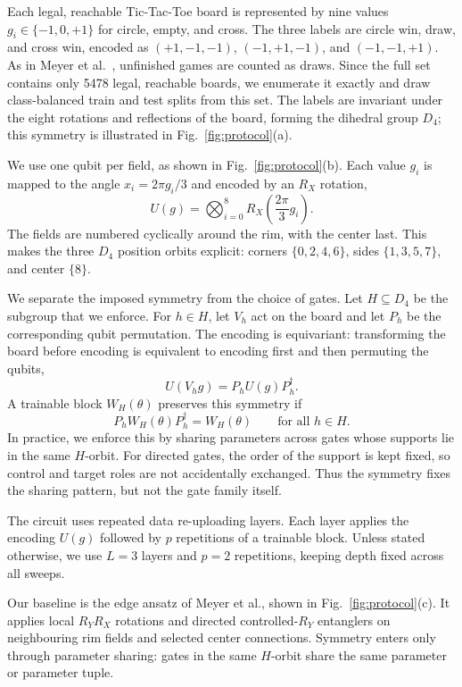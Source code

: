 Each legal, reachable Tic-Tac-Toe board is represented by
nine values $g_i\in\{-1,0,+1\}$ for circle, empty, and cross.
The three labels are circle win, draw, and cross win, encoded
as $(+1,-1,-1)$, $(-1,+1,-1)$, and $(-1,-1,+1)$. As in
Meyer et al.~\cite{meyer2023symmetry}, unfinished games are
counted as draws. Since the full set contains only 5478 legal,
reachable boards, we enumerate it exactly and draw
class-balanced train and test splits from this set. The labels
are invariant under the eight rotations and reflections of the
board, forming the dihedral group $D_4$; this symmetry is
illustrated in Fig.~\ref{fig:protocol}(a).

We use one qubit per field, as shown in Fig.~\ref{fig:protocol}(b).
Each value $g_i$ is mapped to the angle $x_i=2\pi g_i/3$ and
encoded by an $R_X$ rotation,
\[
U(g)=\bigotimes_{i=0}^{8} R_X\!\left(\frac{2\pi}{3}g_i\right).
\]
The fields are numbered cyclically around the rim, with the
center last. This makes the three $D_4$ position orbits explicit:
corners $\{0,2,4,6\}$, sides $\{1,3,5,7\}$, and center $\{8\}$.

We separate the imposed symmetry from the choice of gates.
Let $H\subseteq D_4$ be the subgroup that we enforce. For
$h\in H$, let $V_h$ act on the board and let $P_h$ be the
corresponding qubit permutation. The encoding is equivariant:
transforming the board before encoding is equivalent to
encoding first and then permuting the qubits,
\[
U(V_h g)=P_h U(g) P_h^\dagger .
\]
A trainable block $W_H(\theta)$ preserves this symmetry if
\[
P_h W_H(\theta) P_h^\dagger = W_H(\theta)
\qquad \text{for all } h\in H .
\]
In practice, we enforce this by sharing parameters across gates
whose supports lie in the same $H$-orbit. For directed gates,
the order of the support is kept fixed, so control and target
roles are not accidentally exchanged. Thus the symmetry fixes
the sharing pattern, but not the gate family itself.

The circuit uses repeated data re-uploading layers. Each layer
applies the encoding $U(g)$ followed by $p$ repetitions of a
trainable block. Unless stated otherwise, we use $L=3$ layers
and $p=2$ repetitions, keeping depth fixed across all sweeps.

Our baseline is the edge ansatz of Meyer et al.,
shown in Fig.~\ref{fig:protocol}(c). It applies local $R_YR_X$
rotations and directed controlled-$R_Y$ entanglers on neighbouring
rim fields and selected center connections. Symmetry enters only
through parameter sharing: gates in the same $H$-orbit share the
same parameter or parameter tuple.

